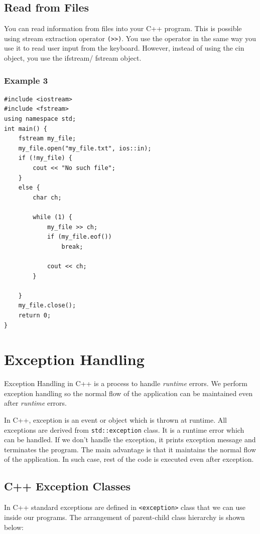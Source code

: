 \documentclass{book}
\begin{document}
\section{Read from Files}

You can read information from files into your C++ program. This is possible using stream extraction operator \texttt{(>>)}. You use the operator in the same way you use it to read user input from the keyboard. However, instead of using the cin object, you use the ifstream/ fstream object.

\subsection{Example 3}

\begin{lstlisting}
#include <iostream>
#include <fstream>
using namespace std;
int main() {
	fstream my_file;
	my_file.open("my_file.txt", ios::in);
	if (!my_file) {
		cout << "No such file";
	}
	else {
		char ch;

		while (1) {
			my_file >> ch;
			if (my_file.eof())
				break;

			cout << ch;
		}

	}
	my_file.close();
	return 0;
}
\end{lstlisting}

\chapter{Exception Handling}

Exception Handling in C++ is a process to handle \textit{runtime} errors. We perform exception handling so the normal flow of the application can be maintained even after \textit{runtime} errors.

In C++, exception is an event or object which is thrown at runtime. All exceptions are derived from \texttt{std::exception} class. It is a runtime error which can be handled. If we don't handle the exception, it prints exception message and terminates the program. The main advantage is that it maintains the normal flow of the application. In such case, rest of the code is executed even after exception.

\section{C++ Exception Classes}

In C++ standard exceptions are defined in \texttt{<exception>} class that we can use inside our programs. The arrangement of parent-child class hierarchy is shown below:
\end{document}
